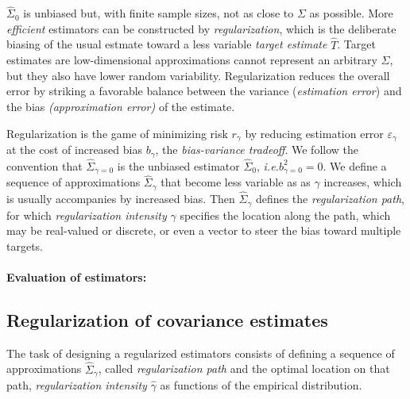 $\hat\Sigma_0$ is unbiased but, with finite sample sizes, not as close to $\Sigma$ as possible.  More \emph{efficient} estimators can be constructed by \emph{regularization}, which is the deliberate biasing of the usual estmate toward a less variable \emph{target estimate} $\hat T$. Target estimates are low-dimensional approximations cannot represent an arbitrary $\Sigma$, but they also have lower random variability.
Regularization reduces the overall error by striking a favorable balance between the variance  (\emph{estimation error}) and the bias \emph{(approximation error)} of the estimate.  


Regularization is the game of minimizing risk $r_\gamma$ by reducing estimation error $\varepsilon_\gamma$ at the cost of increased bias $b_\gamma$, the \emph{bias-variance tradeoff}.  
We follow the convention that $\hat\Sigma_{\gamma=0}$ is the unbiased estimator $\hat\Sigma_0$, \emph{i.e.}\;$b_{\gamma=0}^2 = 0$. 
We define a sequence of approximations $\hat\Sigma_\gamma$ that become less variable as as $\gamma$ increases, which is usually accompanies by increased bias. Then $\hat\Sigma_\gamma$ defines the \emph{regularization path}, for which \emph{regularization intensity} $\gamma$ specifies the location along the path, which may be real-valued or discrete, or even a vector to steer the bias toward multiple targets.  


\paragraph{Evaluation of estimators:}


 
\subsection{Regularization of covariance estimates}
The task of designing a regularized estimators consists of defining a sequence of approximations $\hat\Sigma_\gamma$, called \emph{regularization path} and the optimal location on that path, \emph{regularization intensity} $\hat\gamma$ as  functions of the empirical distribution. 


